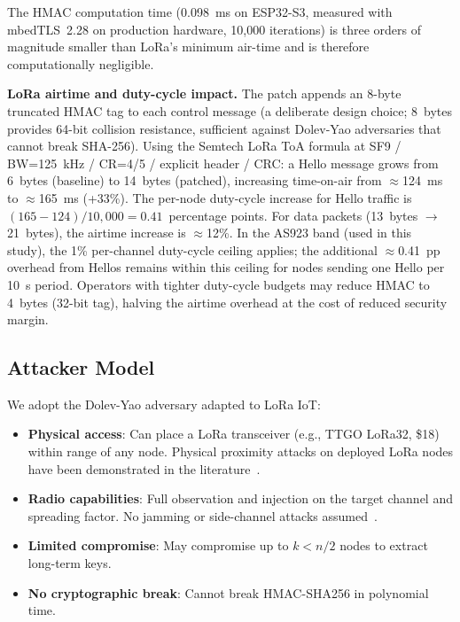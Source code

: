 \documentclass[10pt,journal,compsoc]{IEEEtran}
\begin{document}
The HMAC computation time (0.098~ms on ESP32-S3, measured with
mbedTLS~2.28 on production hardware, 10{,}000 iterations) is three
orders of magnitude smaller than LoRa's minimum air-time and is
therefore computationally negligible.

\textbf{LoRa airtime and duty-cycle impact.}
The patch appends an 8-byte truncated HMAC tag to each
control message (a deliberate design choice; 8~bytes provides
64-bit collision resistance, sufficient against Dolev-Yao adversaries
that cannot break SHA-256). Using the Semtech LoRa ToA formula at
SF9 / BW=125~kHz / CR=4/5 / explicit header / CRC:
a Hello message grows from 6~bytes (baseline) to 14~bytes (patched),
increasing time-on-air from $\approx$124~ms to $\approx$165~ms
(+33\%). The per-node duty-cycle increase for Hello traffic is
$(165-124)/10{,}000 = 0.41$~percentage points. For data packets
(13~bytes $\to$ 21~bytes), the airtime increase is $\approx$12\%.
In the AS923 band (used in this study), the 1\% per-channel
duty-cycle ceiling applies; the additional $\approx$0.41~pp overhead
from Hellos remains within this ceiling for nodes sending one Hello
per 10~s period. Operators with tighter duty-cycle budgets may
reduce HMAC to 4~bytes (32-bit tag), halving the airtime overhead
at the cost of reduced security margin.

\subsection{Attacker Model}

We adopt the Dolev-Yao adversary adapted to LoRa IoT:

\begin{itemize}
  \item \textbf{Physical access}: Can place a LoRa transceiver
    (e.g., TTGO LoRa32, \$18) within range of any node.
    Physical proximity attacks on deployed LoRa nodes have been
    demonstrated in the literature~\cite{ieee2025-lora-adversarial,bringye2026-lorawan-ids}.
  \item \textbf{Radio capabilities}: Full observation and injection
    on the target channel and spreading factor. No jamming or
    side-channel attacks assumed~\cite{ieee2025-lorawan-jamming-ids}.
  \item \textbf{Limited compromise}: May compromise up to $k < n/2$
    nodes to extract long-term keys.
  \item \textbf{No cryptographic break}: Cannot break HMAC-SHA256
    in polynomial time.
\end{itemize}
\end{document}
